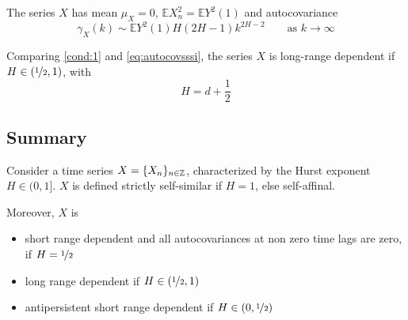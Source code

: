 The series $X$ has mean $\mu_X = 0$, $\mathbb{E}X^2_n = \mathbb{E}Y^2(1)$ and autocovariance 
\begin{equation}\label{eq:autocovsssi}
	\gamma_X(k) \sim \mathbb{E}Y^2(1) H (2H -1) k^{2H-2} \qquad \text{as $k \to \infty$}
\end{equation}

Comparing \autoref{cond:1} and \autoref{eq:autocovsssi}, the series $X$ is long-range dependent if $H \in (\nicefrac{1}{2}, 1)$, with
\begin{equation}
	H = d + \frac{1}{2}
\end{equation}

\subsection{Summary}
Consider a time series $X = \{X_n\}_{n \in \mathbb{Z}}$, characterized by the Hurst exponent $H \in (0, 1]$. $X$ is defined strictly self-similar if $H = 1$, else self-affinal.

Moreover, $X$ is
\begin{itemize}
	\item short range dependent and all autocovariances at non zero time lags are zero, if $H =\nicefrac{1}{2}$ \cite{Beran:2304008}
	\item long range dependent if $H \in (\nicefrac{1}{2}, 1)$
	\item antipersistent short range dependent if $H \in (0, \nicefrac{1}{2})$
\end{itemize}
